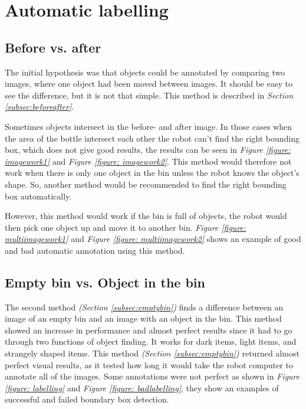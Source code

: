 \section{Automatic labelling}
\subsection{Before vs. after}
The initial hypothesis was that objects could be annotated by comparing two images, where one object had been moved between images. It should be easy to see the difference, but it is not that simple. This method is described in \textit{Section \ref{subsec:beforeafter}}.

Sometimes objects intersect in the before- and after image. In those cases when the area of the bottle intersect each other the robot can't find the right bounding box, which does not give good results, the results can be seen in \textit{Figure \ref{figure: imagework1}} and \textit{Figure \ref{figure: imagework2}}. This method would therefore not work when there is only one object in the bin unless the robot knows the object's shape. So, another method would be recommended to find the right bounding box automatically. 

However, this method would work if the bin is full of objects, the robot would then pick one object up and move it to another bin. \textit{Figure \ref{figure: multiimagework1}} and \textit{Figure \ref{figure: multiimagework2}} shows an example of good and bad automatic annotation using this method. 

\subsection{Empty bin vs. Object in the bin}
The second method \textit{(Section \ref{subsec:emptybin})} finds a difference between an image of an empty bin and an image with an object in the bin. 
This method showed an increase in performance and almost perfect results since it had to go through two functions of object finding. It works for dark items, light items, and strangely shaped items. 
This method \textit{(Section \ref{subsec:emptybin})} returned almost perfect visual results, as it tested how long it would take the robot computer to annotate all of the images. Some annotations were not perfect as shown in \textit{Figure \ref{figure: labelling}} and \textit{Figure \ref{figure: badlabelling}}, they show an examples of successful and failed boundary box detection.

